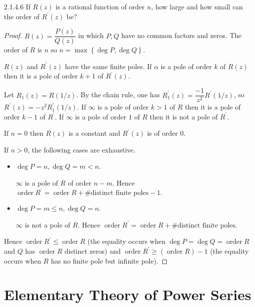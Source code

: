 \begin{problem}{2.1.4.6}
If \( R(z) \) is a rational function of order \( n \), how large and how small can the order of \( R^{\prime}(z) \) be?
\end{problem}

\begin{proof}
	\( R(z) = \dfrac{P(z)}{Q(z)} \) in which \( P, Q \) have no common factors and zeros. The order of \( R \) is \( n \) so \( n = \max\left\{ \deg P, \deg Q \right\} \).

	\( R(z) \) and \( R^{\prime}(z) \) have the same finite poles. If \( \alpha \) is a pole of order \( k \) of \( R(z) \) then it is a pole of order \( k + 1 \) of \( R^{\prime}(z) \).

	Let \( R_{1}(z) = R(1/z) \). By the chain rule, one has \( R_{1}^{\prime}(z) = \dfrac{-1}{z^{2}} R^{\prime}(1/z) \), so \( R^{\prime}(z) = -z^{2} R_{1}^{\prime}(1/z) \). If \( \infty \) is a pole of order \( k > 1 \) of \( R \) then it is a pole of order \( k - 1 \) of \( R^{\prime} \). If \( \infty \) is a pole of order \( 1 \) of \( R \) then it is not a pole of \( R^{\prime} \).

	If \( n = 0 \) then \( R(z) \) is a constant and \( R^{\prime}(z) \) is of order \( 0 \).

	If \( n > 0 \), the following cases are exhaustive.
	\begin{itemize}
		\item \( \deg P = n, \deg Q = m < n \).

		      \( \infty \) is a pole of \( R \) of order \( n - m \). Hence \( \operatorname{order} R^{\prime} = \operatorname{order} R + \#\text{distinct finite poles} - 1. \)
		\item \( \deg P = m \le n, \deg Q = n \).

		      \( \infty \) is not a pole of \( R \). Hence \( \operatorname{order} R^{\prime} = \operatorname{order} R + \#\text{distinct finite poles}. \)
	\end{itemize}

	Hence \( \operatorname{order} R^{\prime} \le \operatorname{order} R \) (the equality occurs when \( \deg P = \deg Q = \operatorname{order} R \) and \( Q \) has \( \operatorname{order} R \) distinct zeros) and \( \operatorname{order} R^{\prime} \ge (\operatorname{order} R) - 1 \) (the equality occurs when \(R\) has no finite pole but infinite pole).
\end{proof}

\section{Elementary Theory of Power Series}

